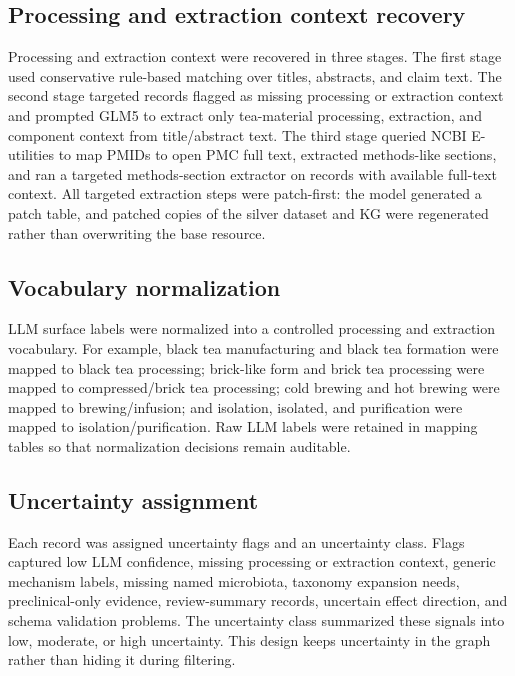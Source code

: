 \documentclass[11pt]{article}
\begin{document}
\subsection{Processing and extraction context recovery}

Processing and extraction context were recovered in three stages. The first stage used conservative rule-based matching over titles, abstracts, and claim text. The second stage targeted records flagged as missing processing or extraction context and prompted GLM5 to extract only tea-material processing, extraction, and component context from title/abstract text. The third stage queried NCBI E-utilities to map PMIDs to open PMC full text, extracted methods-like sections, and ran a targeted methods-section extractor on records with available full-text context. All targeted extraction steps were patch-first: the model generated a patch table, and patched copies of the silver dataset and KG were regenerated rather than overwriting the base resource.

\subsection{Vocabulary normalization}

LLM surface labels were normalized into a controlled processing and extraction vocabulary. For example, black tea manufacturing and black tea formation were mapped to black tea processing; brick-like form and brick tea processing were mapped to compressed/brick tea processing; cold brewing and hot brewing were mapped to brewing/infusion; and isolation, isolated, and purification were mapped to isolation/purification. Raw LLM labels were retained in mapping tables so that normalization decisions remain auditable.

\subsection{Uncertainty assignment}

Each record was assigned uncertainty flags and an uncertainty class. Flags captured low LLM confidence, missing processing or extraction context, generic mechanism labels, missing named microbiota, taxonomy expansion needs, preclinical-only evidence, review-summary records, uncertain effect direction, and schema validation problems. The uncertainty class summarized these signals into low, moderate, or high uncertainty. This design keeps uncertainty in the graph rather than hiding it during filtering.
\end{document}
